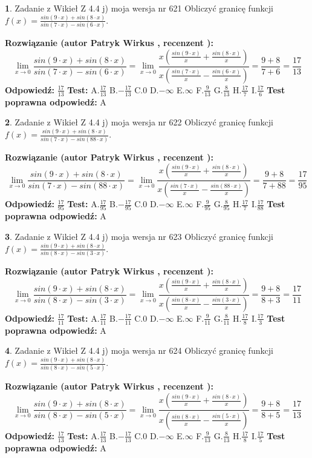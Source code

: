 \documentclass[12pt, a4paper]{article}
\theoremstyle{definition} %
\newtheorem{zad}{}
\newcommand{\zadStart}[1]{\begin{zad}#1\newline}
\newcommand{\zadStop}{\end{zad}}
\newcommand{\rozwStart}[2]{\noindent \textbf{Rozwiązanie (autor #1 , recenzent #2): }\newline}
\newcommand{\rozwStop}{\newline}
\newcommand{\odpStart}{\noindent \textbf{Odpowiedź:}\newline}
\newcommand{\odpStop}{\newline}
\newcommand{\testStart}{\noindent \textbf{Test:}\newline}
\newcommand{\testStop}{\newline}
\newcommand{\kluczStart}{\noindent \textbf{Test poprawna odpowiedź:}\newline}
\newcommand{\kluczStop}{\newline}
\begin{document}
\zadStart{Zadanie z Wikieł Z 4.4 j) moja wersja nr 621}
Obliczyć granicę funkcji $f(x)=\frac{sin(9\cdot x) +sin(8\cdot x)}{sin(7\cdot x) -sin(6\cdot x)}$.
\zadStop
\rozwStart{Patryk Wirkus}{}
$$\lim\limits_{x\to 0}\frac{sin(9\cdot x) +sin(8\cdot x)}{sin(7\cdot x) -sin(6\cdot x)}=\lim\limits_{x\to 0}\frac{x(\frac{sin(9\cdot x)}{x}+\frac{sin(8\cdot x)}{x})}{x(\frac{sin(7\cdot x)}{x}-\frac{sin(6\cdot x)}{x})}=\frac{9+8}{7+6} = \frac{17}{13}$$
\rozwStop
\odpStart
$\frac{17}{13}$
\odpStop
\testStart
A.$\frac{17}{13}$
B.$-\frac{17}{13}$
C.$0$
D.$-\infty$
E.$\infty$
F.$\frac{9}{13}$
G.$\frac{8}{13}$
H.$\frac{17}{7}$
I.$\frac{17}{6}$
\testStop
\kluczStart
A
\kluczStop



\zadStart{Zadanie z Wikieł Z 4.4 j) moja wersja nr 622}
Obliczyć granicę funkcji $f(x)=\frac{sin(9\cdot x) +sin(8\cdot x)}{sin(7\cdot x) -sin(88\cdot x)}$.
\zadStop
\rozwStart{Patryk Wirkus}{}
$$\lim\limits_{x\to 0}\frac{sin(9\cdot x) +sin(8\cdot x)}{sin(7\cdot x) -sin(88\cdot x)}=\lim\limits_{x\to 0}\frac{x(\frac{sin(9\cdot x)}{x}+\frac{sin(8\cdot x)}{x})}{x(\frac{sin(7\cdot x)}{x}-\frac{sin(88\cdot x)}{x})}=\frac{9+8}{7+88} = \frac{17}{95}$$
\rozwStop
\odpStart
$\frac{17}{95}$
\odpStop
\testStart
A.$\frac{17}{95}$
B.$-\frac{17}{95}$
C.$0$
D.$-\infty$
E.$\infty$
F.$\frac{9}{95}$
G.$\frac{8}{95}$
H.$\frac{17}{7}$
I.$\frac{17}{88}$
\testStop
\kluczStart
A
\kluczStop



\zadStart{Zadanie z Wikieł Z 4.4 j) moja wersja nr 623}
Obliczyć granicę funkcji $f(x)=\frac{sin(9\cdot x) +sin(8\cdot x)}{sin(8\cdot x) -sin(3\cdot x)}$.
\zadStop
\rozwStart{Patryk Wirkus}{}
$$\lim\limits_{x\to 0}\frac{sin(9\cdot x) +sin(8\cdot x)}{sin(8\cdot x) -sin(3\cdot x)}=\lim\limits_{x\to 0}\frac{x(\frac{sin(9\cdot x)}{x}+\frac{sin(8\cdot x)}{x})}{x(\frac{sin(8\cdot x)}{x}-\frac{sin(3\cdot x)}{x})}=\frac{9+8}{8+3} = \frac{17}{11}$$
\rozwStop
\odpStart
$\frac{17}{11}$
\odpStop
\testStart
A.$\frac{17}{11}$
B.$-\frac{17}{11}$
C.$0$
D.$-\infty$
E.$\infty$
F.$\frac{9}{11}$
G.$\frac{8}{11}$
H.$\frac{17}{8}$
I.$\frac{17}{3}$
\testStop
\kluczStart
A
\kluczStop



\zadStart{Zadanie z Wikieł Z 4.4 j) moja wersja nr 624}
Obliczyć granicę funkcji $f(x)=\frac{sin(9\cdot x) +sin(8\cdot x)}{sin(8\cdot x) -sin(5\cdot x)}$.
\zadStop
\rozwStart{Patryk Wirkus}{}
$$\lim\limits_{x\to 0}\frac{sin(9\cdot x) +sin(8\cdot x)}{sin(8\cdot x) -sin(5\cdot x)}=\lim\limits_{x\to 0}\frac{x(\frac{sin(9\cdot x)}{x}+\frac{sin(8\cdot x)}{x})}{x(\frac{sin(8\cdot x)}{x}-\frac{sin(5\cdot x)}{x})}=\frac{9+8}{8+5} = \frac{17}{13}$$
\rozwStop
\odpStart
$\frac{17}{13}$
\odpStop
\testStart
A.$\frac{17}{13}$
B.$-\frac{17}{13}$
C.$0$
D.$-\infty$
E.$\infty$
F.$\frac{9}{13}$
G.$\frac{8}{13}$
H.$\frac{17}{8}$
I.$\frac{17}{5}$
\testStop
\kluczStart
A
\kluczStop
\end{document}
